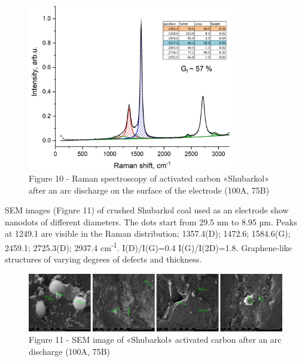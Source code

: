 \begin{figure}[H]
	\centering
	\includegraphics[width=0.8\textwidth]{assets/62}
	\caption*{Figure 10 - Raman spectroscopy of activated carbon «Shubarkol» after an arc discharge on the surface of the electrode (100A, 75B)}
\end{figure}

\begin{multicols}{2}
SEM images (Figure 11) of crushed Shubarkol coal used as an electrode
show nanodots of different diameters. The dots start from 29.5 nm to
8.95 µm. Peaks at 1249.1 are visible in the Raman distribution;
1357.4(D); 1472.6; 1584.6(G); 2459.1; 2725.3(D); 2937.4
cm\textsuperscript{-1}. I(D)/I(G)=0.4 I(G)/I(2D)=1.8. Graphene-like
structures of varying degrees of defects and thickness.
\end{multicols}

\begin{figure}[H]
	\centering
	\includegraphics[width=\textwidth]{assets/63}
	\caption*{Figure 11 - SEM image of «Shubarkol» activated carbon after an arc discharge (100A, 75B)}
\end{figure}

